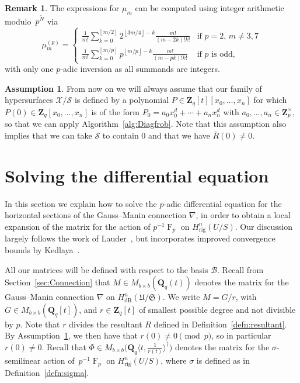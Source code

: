 \documentclass[a4paper,11pt]{article}
\numberwithin{equation}{section}
\providecommand{\floor}[1]{\left\lfloor#1\right\rfloor}   %
\newcommand{\ZZ}{\mathbf{Z}} %
\newcommand{\QQ}{\mathbf{Q}} %
\DeclareMathOperator{\Frob}{F}           %
\providecommand{\HdR}{H_{\text{dR}}}    %
\providecommand{\Hrig}{H_{\text{rig}}}  %
\providecommand{\cB}{\mathcal{B}} %
\theoremstyle{definition}
\newtheorem{rem}[thm]{Remark}
\newtheorem{assump}[thm]{Assumption}
\begin{document}
\begin{rem} \label{rem:mup}
The expressions for $\mu_m$ can be computed using integer arithmetic 
modulo~$p^{\tilde{N}}$ via 
\begin{equation*}
\mu_m^{(p)} = \begin{cases}
\frac{1}{m!} \sum_{k=0}^{\floor{m/2}} 2^{\floor{3m/4} - k} \frac{m!}{(m-2k)! k!}
    & \text{if $p = 2$, $m \neq 3, 7$} \\
\frac{1}{m!} \sum_{k=0}^{\floor{m/p}} p^{\floor{m/p} - k} \frac{m!}{(m-pk)! k!}
    & \text{if $p$ is odd},
\end{cases}
\end{equation*}
with only one $p$-adic inversion as all summands are integers. 
\end{rem}

\begin{assump} \label{assump:diag}
From now on we will always assume that our family of hypersurfaces $\mathcal{X}/\mathcal{S}$ 
is defined by a polynomial $P \in \ZZ_q[t][x_0,\ldots,x_n]$ for which $P(0) \in \ZZ_q[x_0,\ldots,x_n]$ 
is of the form $P_0=a_0 x_0^d + \dotsb + a_n x_n^d$ with $a_0,\dotsc,a_n \in \ZZ_p^{\times}$, so that we
can apply Algorithm~\ref{alg:Diagfrob}. Note that this assumption also implies that we can take $\mathcal{S}$
to contain $0$ and that we have $\overline{R}(0) \neq 0$.
\end{assump}


\section{Solving the differential equation}
\label{sec:DifferentialSystem}

In this section we explain how to solve the $p$-adic differential 
equation for the horizontal sections of the Gauss--Manin 
connection $\nabla$, in order to obtain a local expansion of the 
matrix for the action of $p^{-1} \Frob_p$ on $\Hrig^{n}(U/S)$.  
Our discussion largely follows the work of Lauder~\citep{Lauder2006}, 
but incorporates improved convergence bounds by Kedlaya~\citep{Kedlaya2010}.

All our matrices will be defined with respect to the basis $\cB$. Recall from Section~\ref{sec:Connection} 
that $M \in M_{b \times b}(\QQ_q(t))$ denotes the matrix for the Gauss--Manin connection $\nabla$ on 
$\HdR^n(\mathfrak{U}/\mathfrak{S})$. We write $M = G/r$, with $G \in M_{b \times b}(\QQ_q[t])$,
and $r \in \ZZ_q[t]$ of smallest possible degree and not divisible by $p$. Note that $r$ divides the 
resultant $R$ defined in Definition~\ref{defn:resultant}. By Assumption~\ref{assump:diag}, we then have 
that $r(0) \neq 0 \pmod{p}$, so in particular $r(0) \neq 0$. Recall that 
$\Phi \in M_{b \times b} \bigl(\QQ_q \langle t,\frac{1}{r(t)} \rangle^{\dag} \bigr)$ denotes the matrix 
for the $\sigma$-semilinear action of~$p^{-1} \Frob_p$ on $\Hrig^{n}(U/S)$, where $\sigma$ is defined as 
in Definition~\ref{defn:sigma}. 
\end{document}
